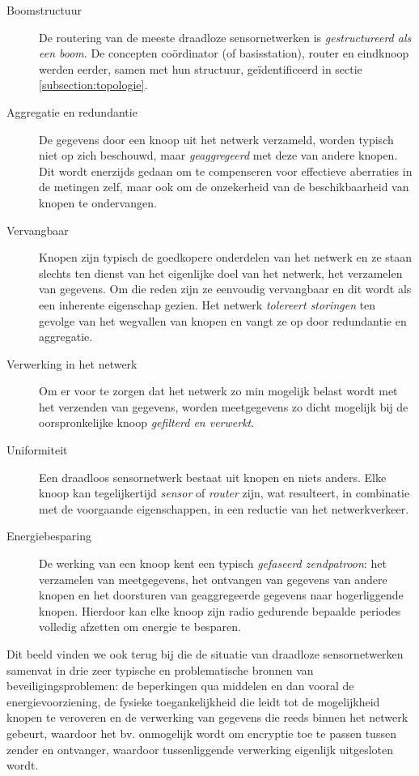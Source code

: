 \begin{description}

  \item[Boomstructuur] De routering van de meeste draadloze sensornetwerken is
  \emph{gestructureerd als een boom}. De concepten co\"ordinator (of
  basisstation), router en eindknoop werden eerder, samen met hun structuur,
  ge\"identificeerd in sectie \ref{subsection:topologie}.

  \item[Aggregatie en redundantie] De gegevens door een knoop uit het netwerk
  verzameld, worden typisch niet op zich beschouwd, maar \emph{geaggregeerd}
  met deze van andere knopen. Dit wordt enerzijds gedaan om te compenseren voor
  effectieve aberraties in de metingen zelf, maar ook om de onzekerheid van de
  beschikbaarheid van knopen te ondervangen.

  \item[Vervangbaar] Knopen zijn typisch de goedkopere onderdelen van het
  netwerk en ze staan slechts ten dienst van het eigenlijke doel van het
  netwerk, het verzamelen van gegevens. Om die reden zijn ze eenvoudig
  vervangbaar en dit wordt als een inherente eigenschap gezien. Het netwerk
  \emph{tolereert storingen} ten gevolge van het wegvallen van knopen en vangt
  ze op door redundantie en aggregatie.

  \item[Verwerking in het netwerk] Om er voor te zorgen dat het netwerk zo min
  mogelijk belast wordt met het verzenden van gegevens, worden meetgegevens zo
  dicht mogelijk bij de oorspronkelijke knoop \emph{gefilterd en verwerkt}.

  \item[Uniformiteit] Een draadloos sensornetwerk bestaat uit knopen en niets
  anders. Elke knoop kan tegelijkertijd \emph{sensor} of \emph{router} zijn,
  wat resulteert, in combinatie met de voorgaande eigenschappen, in een
  reductie van het netwerkverkeer.

  \item[Energiebesparing] De werking van een knoop kent een typisch
  \emph{gefaseerd zendpatroon}: het verzamelen van meetgegevens, het ontvangen
  van gegevens van andere knopen en het doorsturen van geaggregeerde gegevens
  naar hogerliggende knopen. Hierdoor kan elke knoop zijn radio gedurende
  bepaalde periodes volledig afzetten om energie te besparen.

\end{description}

Dit beeld vinden we ook terug bij \citep{aschenbruck2012security} die de
situatie van draadloze sensornetwerken samenvat in drie zeer typische en
problematische bronnen van beveiligingsproblemen: de beperkingen qua middelen
en dan vooral de energievoorziening, de fysieke toegankelijkheid die leidt tot
de mogelijkheid knopen te veroveren en de verwerking van gegevens die reeds
binnen het netwerk gebeurt, waardoor het bv. onmogelijk wordt om encryptie toe
te passen tussen zender en ontvanger, waardoor tussenliggende verwerking
eigenlijk uitgesloten wordt.

